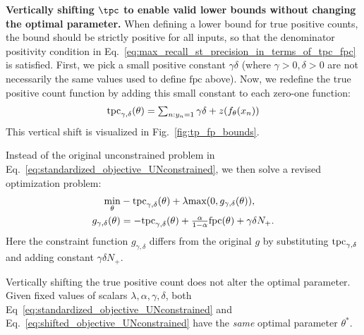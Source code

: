 \textbf{Vertically shifting $\tpc$ to enable valid lower bounds without changing the optimal parameter.}
When defining a lower bound for true positive counts, the bound should be strictly positive for all inputs, so that the denominator positivity condition in Eq.~\eqref{eq:max_recall_st_precision_in_terms_of_tpc_fpc} is satisfied.
First, we pick a small positive constant $\gamma \delta$ (where $\gamma > 0, \delta > 0$ are not necessarily the same values used to define $\text{fpc}$ above).
Now, we redefine the true positive count function by adding this small constant to each zero-one function:
\begin{align} \textstyle
    \textnormal{tpc}_{\gamma,\delta}(\theta) = \sum_{n: y_n=1} \gamma \delta + z(f_{\theta}(x_n))
\end{align}
This vertical shift is visualized in Fig.~\ref{fig:tp_fp_bounds}.

Instead of the original unconstrained problem in Eq.~\ref{eq:standardized_objective_UNconstrained}, we then solve a revised optimization problem:
\begin{align}
    \min_{\theta} &- \text{tpc}_{\gamma,\delta}(\theta) + \lambda \text{max}(0, g_{\gamma,\delta}(\theta) ),
    \label{eq:shifted_objective_UNconstrained}
\\ \notag
    g_{\gamma,\delta}(\theta) &= -\textnormal{tpc}_{\gamma,\delta}(\theta) + \textstyle \frac{\alpha}{1-\alpha} \text{fpc}(\theta) + \gamma \delta N_+.
\end{align}
Here the constraint function $g_{\gamma, \delta}$ differs from the original $g$ by substituting $\textnormal{tpc}_{\gamma,\delta}$ and adding constant $\gamma \delta N_{+}$.

\begin{lemma}
Vertically shifting the true positive count does not alter the optimal parameter. Given fixed values of scalars $\lambda, \alpha, \gamma, \delta$, both Eq~\eqref{eq:standardized_objective_UNconstrained} and Eq.~\eqref{eq:shifted_objective_UNconstrained} have the \emph{same} optimal parameter $\theta^*$.
\end{lemma}

